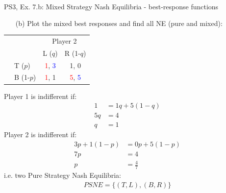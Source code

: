 \begin{frame}{PS3, Ex. 7.b: Mixed Strategy Nash Equilibria - best-response functions}
  \begin{multicols}{2}
    \begin{itemize}
      \item[(b)] Plot the mixed best responses and find all NE (pure and mixed):
    \end{itemize}
    \begin{table}
      \begin{tabular}{cl|c|c|}
        & \multicolumn{1}{c}{} & \multicolumn{2}{c}{\color{blue}Player 2}\\
        \parbox[t]{1mm}{}
        &  &  &  \\
        & T  ($p$)  & \textcolor{red}{1}, \textcolor{blue}{3} & 1, 0 \\
        & B  (1-$p$)& \textcolor{red}{1}, 1 & \textcolor{red}{5}, \textcolor{blue}{5} \\
      \end{tabular}
    \end{table}
    Player 1 is indifferent if:
    \begin{align*}
      1 &= 1q + 5(1-q) \\
      5q&= 4          \\
      q &= 1
    \end{align*}
    Player 2 is indifferent if:
    \begin{align*}
      3p + 1(1-p)&= 0p+5(1-p)\\
      7p         &= 4     \\
      p          &= \frac{4}{7}
    \end{align*}
    i.e. two Pure Strategy Nash Equilibria:
    \begin{align*}
      PSNE=\{(T,L),(B,R)\}
    \end{align*}
  \vfill\null \columnbreak

\end{multicols}
\end{frame}
